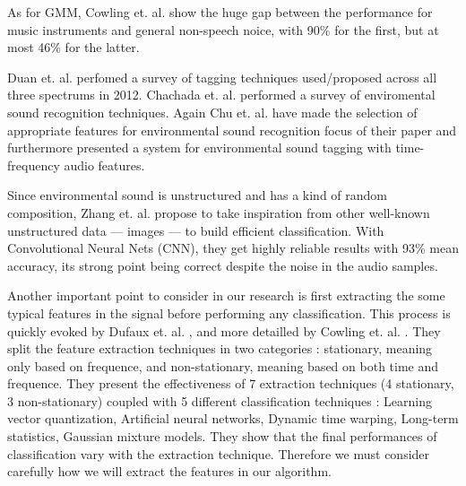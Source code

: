 \documentclass{article} %
\begin{document}
    As for GMM, Cowling et. al. \cite{cite1} show the huge gap between the performance for music instruments and general non-speech noice, with 90\% for the first, but at most 46\% for the latter.
    
    Duan et. al. \cite{cite5} perfomed a survey of tagging techniques used/proposed across all three spectrums in 2012. Chachada et. al. \cite{cite6} performed a survey of enviromental sound recognition techniques. Again Chu et. al. \cite{cite7} have made the selection of appropriate features for environmental sound recognition focus of their paper and furthermore presented \cite{cite8} a system for environmental sound tagging with time-frequency audio features.

    Since environmental sound is unstructured and has a kind of random composition, Zhang et. al. \cite{cite2} propose to take inspiration from other well-known unstructured data --- images --- to build efficient classification. With Convolutional Neural Nets (CNN), they get highly reliable results with 93\% mean accuracy, its strong point being correct despite the noise in the audio samples.

    Another important point to consider in our research is first extracting the some typical features in the signal before performing any classification. This process is quickly evoked by Dufaux et. al. \cite{cite3}, and more detailled by Cowling et. al. \cite{cite1}. They split the feature extraction techniques in two categories : stationary, meaning only based on frequence, and non-stationary, meaning based on both time and frequence. They present the effectiveness of 7 extraction techniques (4 stationary, 3 non-stationary) coupled with 5 different classification techniques : Learning vector quantization, Artificial neural networks, Dynamic time warping, Long-term statistics, Gaussian mixture models. They show that the final performances of classification vary with the extraction technique. Therefore we must consider carefully how we will extract the features in our algorithm.
\end{document}
